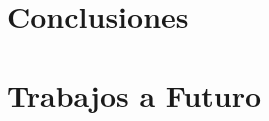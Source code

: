 \documentclass[12pt,twoside]{book}
\begin{document}

\chapter{Conclusiones}
    \label{capConc}



\chapter{Trabajos a Futuro}
    



%




%
\end{document}
